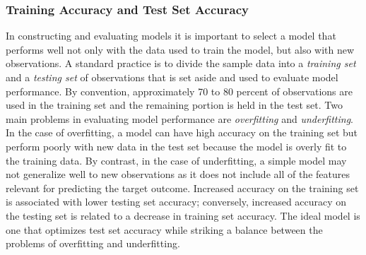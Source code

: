 \documentclass[sigconf]{acmart}
\begin{document}

\subsubsection{Training Accuracy and Test Set Accuracy}

In constructing and evaluating models it is important to select a model 
that performs well not only with the data used to train the model, but 
also with new observations. A standard practice is to divide the sample 
data into a \emph{training set} and a \emph{testing set} of observations 
that is set aside and used to evaluate model performance. By convention, 
approximately 70 to 80 percent of observations are used in the training set 
and the remaining portion is held in the test set. Two main problems in 
evaluating model performance are \emph{overfitting} and \emph{underfitting}. 
In the case of overfitting, a model can have high accuracy on the training 
set but perform poorly with new data in the test set because the model is 
overly fit to the training data. By contrast, in the case of underfitting, 
a simple model may not generalize well to new observations as it does not 
include all of the features relevant for predicting the target outcome. 
Increased accuracy on the training set is associated with lower testing set 
accuracy; conversely, increased accuracy on the testing set is related to a 
decrease in training set accuracy. The ideal model is one that optimizes test 
set accuracy while striking a balance between the problems of overfitting 
and underfitting. 

\end{document}
